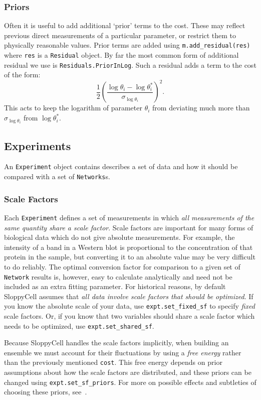 \documentclass[12pt]{article}
\makeatletter
\newcommand{\py}[1]{\lstinline[language=Python, showstringspaces=False]@#1@}
\makeatother
\begin{document}
\subsubsection{Priors}
Often it is useful to add additional `prior' terms to the cost.
These may reflect previous direct measurements of a particular parameter, or  restrict them to physically reasonable values.
Prior terms are added using \py{m.add_residual(res)} where \py{res} is a \py{Residual} object.
By far the most common form of additional residual we use is \py{Residuals.PriorInLog}.
Such a residual adds a term to the cost of the form:
\begin{equation}
\frac{1}{2}\left(\frac{\log \theta_i - \log \theta_i^*}{\sigma_{\log \theta_i}}\right)^2.
\end{equation}
This acts to keep the logarithm of parameter $\theta_i$ from deviating much more than $\sigma_{\log \theta_i}$ from $\log \theta_i^*$.

\subsection{Experiments}
An \py{Experiment} object contains describes a set of data and how it should be compared with a set of \py{Networks}s.

\subsubsection{Scale Factors\label{sec:user:sf}}
Each \py{Experiment} defines a set of measurements in which \emph{all measurements of the same quantity share a scale factor}.
Scale factors are important for many forms of biological data which do not give absolute measurements.
For example, the intensity of a band in a Western blot is proportional to the concentration of that protein in the sample, but converting it to an absolute value may be very difficult to do reliably.
The optimal conversion factor for comparison to a given set of \py{Network} results is, however, easy to calculate analytically and need not be included as an extra fitting parameter.
For historical reasons, by default SloppyCell assumes that \emph{all data involve scale factors that should be optimized}.
If you know the absolute scale of your data, use \py{expt.set_fixed_sf} to specify \emph{fixed} scale factors.
Or, if you know that two variables should share a scale factor which needs to be optimized, use \py{expt.set_shared_sf}.

Because SloppyCell handles the scale factors implicitly, when building an ensemble we must account for their fluctuations by using a \emph{free energy} rather than the previously mentioned \py{cost}.
This free energy depends on prior assumptions about how the scale factors are distributed, and these priors can be changed using \py{expt.set_sf_priors}.
For more on possible effects and subtleties of choosing these priors, see~\cite[Section 6.2]{bib:GutenkunstPhD}. %
\end{document}
